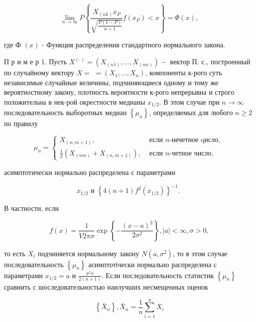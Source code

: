 \documentclass[10pt]{article}
\begin{document}
\[

\lim _{n \rightarrow \infty} P\left\{\frac{X_{(n k)} x_{P}}{\sqrt{\frac{P(1-P)}{n+1}}} f\left(x_{P}\right)<x\right\}=\Phi(x),

\]



где Ф $(x)$ - Функция распределения стандартного нормального закона.



П р и м е р 1. Пусть $X^{(\cdot)}=\left(X_{(n 1)}, \ldots, X_{(n n)}\right)-$ вектор П. с., построенный по случайному вектору $X=$ $=\left(X_{1}, \ldots, X_{n}\right)$, компоненты к-рого суть независимые случайные величины, подчиняющиеся одному и тому же вероятностному закону, плотность вероятности к-рого непрерывна и строго положительна в нек-рой окрестности медианы $x_{1 / 2}$. В этом случае при $n \rightarrow \infty$ последовательность выборотных медиан $\left\{\mu_{n}\right\}$, определяемых для любого $n \geqslant 2$ по правилу



\[

\mu_{n}= \begin{cases}X_{(n, m+1)}, & \text { если } n \text {-нечетное qисло, } \\ \frac{1}{2}\left(X_{(n m)}+X_{(n, m+1)}\right), & \text { если } n \text {-четное число, }\end{cases}

\]



асимптотически нормально распределена с параметрами



\[

x_{1 / 2} \text { и }\left\{4(n+1) f^{2}\left(x_{1 / 2}\right)\right\}^{-1} \text {. }

\]



В частности, если



\[

f(x)=\frac{1}{V \overline{2 \pi} \sigma} \exp \left\{-\frac{(x-a)^{2}}{2 \sigma^{2}}\right\},|a|<\infty, \sigma>0,

\]



то есть $X_{i}$ подчиняется нормальному закону $N\left(a, \sigma^{2}\right)$, то в этом случае последовательность $\left\{\mu_{n}\right\}$ асимптотічески нормально распределена с параметрами $x_{1 / 2}=a$ и $\frac{\sigma^{2} \pi}{2(n+1)}$. Если последовательность статистик $\left\{\mu_{n}\right\}$ сравнить с шоследовательностью наилучших несмещенных оценок



\[

\left\{\bar{X}_{n}\right\}, \bar{X}_{n}=\frac{1}{n} \sum_{i=1}^{n} X_{i}

\]
\end{document}

